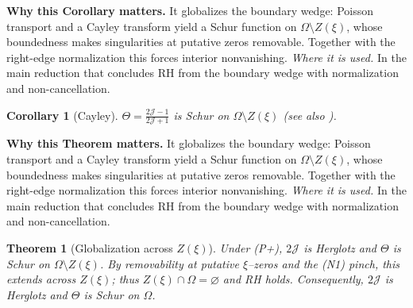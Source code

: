 \documentclass[11pt]{article}
\newtheorem{theorem}{Theorem}[section]
\newtheorem{corollary}{Corollary}[section]
\theoremstyle{definition}
\theoremstyle{remark}
\begin{document}
\vspace{1.0cm}
\noindent\textbf{Why this Corollary matters.} It globalizes the boundary wedge: Poisson transport and a Cayley transform yield a Schur function on $\Omega\setminus Z(\xi)$, whose boundedness makes singularities at putative zeros removable. Together with the right-edge normalization this forces interior nonvanishing.
\noindent\textit{Where it is used.} In the main reduction that concludes RH from the boundary wedge with normalization and non-cancellation.
\begin{corollary}[Cayley]\label{cor:cayley-schur}
$\Theta=\frac{2\mathcal J-1}{2\mathcal J+1}$ is Schur on $\Omega\setminus Z(\xi)$ (see also \cite{RosenblumRovnyak,SarasonSubHardy}).
\end{corollary}



\vspace{1.0cm}
\noindent\textbf{Why this Theorem matters.} It globalizes the boundary wedge: Poisson transport and a Cayley transform yield a Schur function on $\Omega\setminus Z(\xi)$, whose boundedness makes singularities at putative zeros removable. Together with the right-edge normalization this forces interior nonvanishing.
\noindent\textit{Where it is used.} In the main reduction that concludes RH from the boundary wedge with normalization and non-cancellation.
\begin{theorem}[Globalization across $Z(\xi)$]\label{thm:globalize-main}
Under (P+), $2\mathcal J$ is Herglotz and $\Theta$ is Schur on $\Omega\setminus Z(\xi)$. By removability at putative $\xi$--zeros and the (N1) pinch, this extends across $Z(\xi)$; thus $Z(\xi)\cap\Omega=\varnothing$ and RH holds. Consequently, $2\mathcal J$ is Herglotz and $\Theta$ is Schur on $\Omega$.
\end{theorem}
\end{document}

